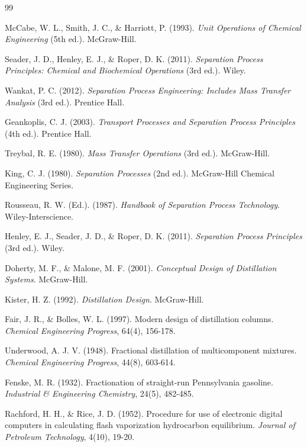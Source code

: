 \documentclass[11pt,a4paper]{article}
\begin{document}
\begin{thebibliography}{99}

McCabe, W. L., Smith, J. C., \& Harriott, P. (1993). \textit{Unit Operations of Chemical Engineering} (5th ed.). McGraw-Hill.

Seader, J. D., Henley, E. J., \& Roper, D. K. (2011). \textit{Separation Process Principles: Chemical and Biochemical Operations} (3rd ed.). Wiley.

Wankat, P. C. (2012). \textit{Separation Process Engineering: Includes Mass Transfer Analysis} (3rd ed.). Prentice Hall.

Geankoplis, C. J. (2003). \textit{Transport Processes and Separation Process Principles} (4th ed.). Prentice Hall.

Treybal, R. E. (1980). \textit{Mass Transfer Operations} (3rd ed.). McGraw-Hill.

King, C. J. (1980). \textit{Separation Processes} (2nd ed.). McGraw-Hill Chemical Engineering Series.

Rousseau, R. W. (Ed.). (1987). \textit{Handbook of Separation Process Technology}. Wiley-Interscience.

Henley, E. J., Seader, J. D., \& Roper, D. K. (2011). \textit{Separation Process Principles} (3rd ed.). Wiley.

Doherty, M. F., \& Malone, M. F. (2001). \textit{Conceptual Design of Distillation Systems}. McGraw-Hill.

Kister, H. Z. (1992). \textit{Distillation Design}. McGraw-Hill.

Fair, J. R., \& Bolles, W. L. (1997). Modern design of distillation columns. \textit{Chemical Engineering Progress}, 64(4), 156-178.

Underwood, A. J. V. (1948). Fractional distillation of multicomponent mixtures. \textit{Chemical Engineering Progress}, 44(8), 603-614.

Fenske, M. R. (1932). Fractionation of straight-run Pennsylvania gasoline. \textit{Industrial \& Engineering Chemistry}, 24(5), 482-485.

Rachford, H. H., \& Rice, J. D. (1952). Procedure for use of electronic digital computers in calculating flash vaporization hydrocarbon equilibrium. \textit{Journal of Petroleum Technology}, 4(10), 19-20.


\end{thebibliography}
\end{document}
